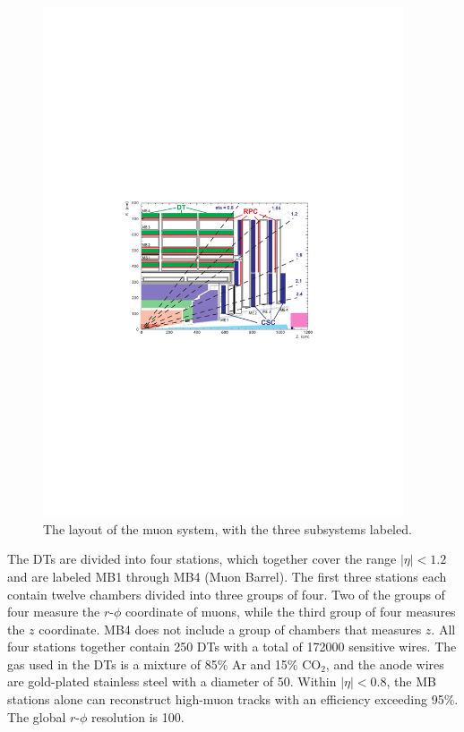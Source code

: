\documentclass[12pt]{thesis}  %
\begin{document}
\begin{figure}[hbt]
\begin{center}
\includegraphics[width=0.95\textwidth]{figures/CMS_muon_system.pdf}
\caption{The layout of the muon system, with the three subsystems labeled.}
\label{fig:muon-system}
\end{center}
\end{figure}

The DTs are divided into four stations, which together cover the range $|\eta|<1.2$ and are labeled MB1 through MB4 (Muon Barrel). The first three stations each contain twelve chambers divided into three groups of four. Two of the groups of four measure the $r$-$\phi$ coordinate of muons, while the third group of four measures the $z$ coordinate. MB4 does not include a group of chambers that measures $z$. All four stations together contain 250 DTs with a total of 172000 sensitive wires. The gas used in the DTs is a mixture of 85\% Ar and 15\% $\text{CO}_2$, and the anode wires are gold-plated stainless steel with a diameter of 50\mum. Within $|\eta|<0.8$, the MB stations alone can reconstruct high-\pt muon tracks with an efficiency exceeding 95\%. The global $r$-$\phi$ resolution is 100\mum.
\end{document}
